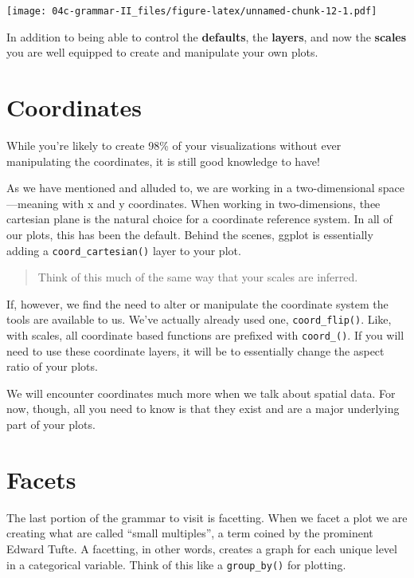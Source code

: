 \documentclass[
]{book}
\begin{document}
\texttt{[image: 04c-grammar-II\_files/figure-latex/unnamed-chunk-12-1.pdf]}

In addition to being able to control the \textbf{defaults}, the \textbf{layers}, and now the \textbf{scales} you are well equipped to create and manipulate your own plots.

\hypertarget{coordinates}{%
\section{Coordinates}\label{coordinates}}

While you're likely to create 98\% of your visualizations without ever manipulating the coordinates, it is still good knowledge to have!

As we have mentioned and alluded to, we are working in a two-dimensional space---meaning with x and y coordinates. When working in two-dimensions, thee cartesian plane is the natural choice for a coordinate reference system. In all of our plots, this has been the default. Behind the scenes, ggplot is essentially adding a \texttt{coord\_cartesian()} layer to your plot.

\begin{quote}
Think of this much of the same way that your scales are inferred.
\end{quote}

If, however, we find the need to alter or manipulate the coordinate system the tools are available to us. We've actually already used one, \texttt{coord\_flip()}. Like, with scales, all coordinate based functions are prefixed with \texttt{coord\_()}. If you will need to use these coordinate layers, it will be to essentially change the aspect ratio of your plots.

We will encounter coordinates much more when we talk about spatial data. For now, though, all you need to know is that they exist and are a major underlying part of your plots.

\hypertarget{facets}{%
\section{Facets}\label{facets}}

The last portion of the grammar to visit is facetting. When we facet a plot we are creating what are called ``small multiples'', a term coined by the prominent Edward Tufte. A facetting, in other words, creates a graph for each unique level in a categorical variable. Think of this like a \texttt{group\_by()} for plotting.
\end{document}
